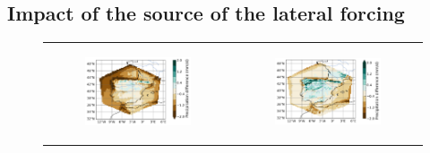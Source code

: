 \subsection{Impact of the source of the lateral forcing}
\label{sec:forcing_source}
\begin{figure}[htbp]
    \centering
    \begin{tabular}{cc}
        \begin{subfigure}[b]{0.33\textwidth}
            \caption{}
            \includegraphics[width=\textwidth]{images/chap4/forcing_source/diff_map_precip_era_era.png}
        \end{subfigure} &
        \begin{subfigure}[b]{0.33\textwidth}
            \caption{}
            \includegraphics[width=\textwidth]{images/chap4/forcing_source/diff_map_precip_ico_era.png}
        \end{subfigure} \\
        

\end{tabular}
\end{figure}
